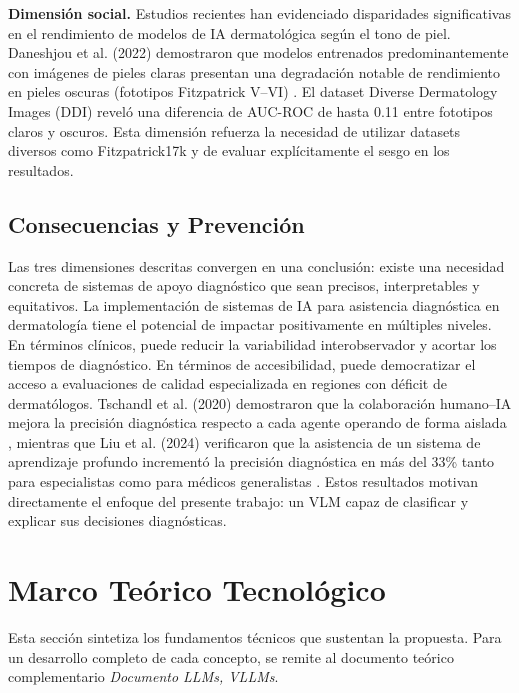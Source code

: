\documentclass[11pt, a4paper]{article}
\begin{document}
\textbf{Dimensión social.} Estudios recientes han evidenciado disparidades significativas en el rendimiento de modelos de IA dermatológica según el tono de piel. Daneshjou et al. (2022) demostraron que modelos entrenados predominantemente con imágenes de pieles claras presentan una degradación notable de rendimiento en pieles oscuras (fototipos Fitzpatrick V--VI) \cite{daneshjou_disparities_2022}. El dataset Diverse Dermatology Images (DDI) reveló una diferencia de AUC-ROC de hasta 0.11 entre fototipos claros y oscuros. Esta dimensión refuerza la necesidad de utilizar datasets diversos como Fitzpatrick17k y de evaluar explícitamente el sesgo en los resultados.

\subsection{Consecuencias y Prevención}

Las tres dimensiones descritas convergen en una conclusión: existe una necesidad concreta de sistemas de apoyo diagnóstico que sean precisos, interpretables y equitativos. La implementación de sistemas de IA para asistencia diagnóstica en dermatología tiene el potencial de impactar positivamente en múltiples niveles. En términos clínicos, puede reducir la variabilidad interobservador y acortar los tiempos de diagnóstico. En términos de accesibilidad, puede democratizar el acceso a evaluaciones de calidad especializada en regiones con déficit de dermatólogos. 
Tschandl et al. (2020) demostraron que la colaboración humano--IA mejora la precisión diagnóstica respecto a cada agente operando de forma aislada \cite{tschandl_human-computer_2020}, mientras que Liu et al. (2024) verificaron que la asistencia de un sistema de aprendizaje profundo incrementó la precisión diagnóstica en más del 33\% tanto para especialistas como para médicos generalistas \cite{liu_deep_learning_aided_2024}. Estos resultados motivan directamente el enfoque del presente trabajo: un VLM capaz de clasificar y explicar sus decisiones diagnósticas.

\section{Marco Teórico Tecnológico}

Esta sección sintetiza los fundamentos técnicos que sustentan la propuesta. Para un desarrollo completo de cada concepto, se remite al documento teórico complementario \emph{Documento LLMs, VLLMs}.
\end{document}
